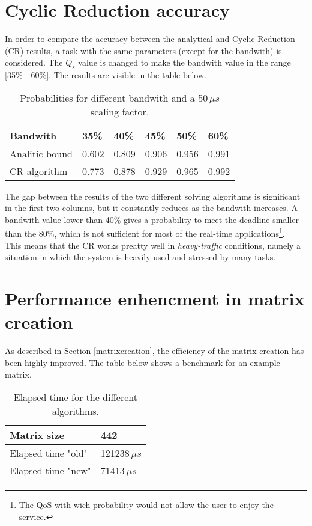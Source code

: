 \section{Cyclic Reduction accuracy} \label{craccuracy}
In order to compare the accuracy between the analytical and Cyclic Reduction (CR) results, a task with the same parameters (except for the bandwith) is considered. The \( Q_{s} \) value is changed to make the bandwith value in the range [35\% - 60\%]. The results are visible in the table below.
\begin{table}[H]
\label{comparison}
\begin{center}
\begin{tabular}{| l | l | l | l | l | l |}
  \hline
  Bandwith & 35\% & 40\% & 45\% & 50\% & 60\% \\ \hline
  Analitic bound & 0.602 & 0.809 & 0.906 & 0.956 & 0.991 \\
  CR algorithm & 0.773 & 0.878 & 0.929 & 0.965 & 0.992 \\ \hline
\end{tabular}
\caption[]{Probabilities for different bandwith and a 50\,\( \mu{s} \) scaling factor\footnotemark[3].}
\end{center} 
\end{table}

The gap between the results of the two different solving algorithms is significant in the first two columns, but it constantly reduces as the bandwith increases. A bandwith value lower than 40\% gives a probability to meet the deadline smaller than the 80\%, which is not sufficient for most of the real-time applications\footnote{The QoS with wich probability would not allow the user to enjoy the service.}.\\
This means that the CR works preatty well in \emph{heavy-traffic} conditions, namely a situation in which the system is heavily used and stressed by many tasks.

\section{Performance enhencment in matrix creation} \label{matrixperformance}
As described in Section \ref{matrixcreation}, the efficiency of the matrix creation has been highly improved. The table below shows a benchmark for an example matrix.
\begin{table}[H]
\label{benchmark}
\begin{center}
\begin{tabular}{| l | l |}
  \hline
  Matrix size & 442 \\ \hline
  Elapsed time "old" & 121238\( \,\mu{s} \) \\ \hline
  Elapsed time "new" & 71413\( \,\mu{s} \) \\ \hline
\end{tabular}
\caption[]{Elapsed time for the different algorithms\footnotemark.}
\end{center}
\end{table}

